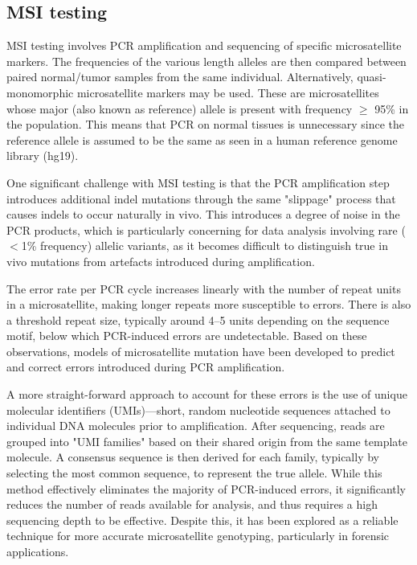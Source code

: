 \documentclass[fleqn,10pt]{olplainarticle}
\begin{document}

\subsection{MSI testing}

MSI testing involves PCR amplification and sequencing of specific microsatellite markers. The frequencies of the various length alleles are then compared between paired normal/tumor samples from the same individual. Alternatively, quasi-monomorphic microsatellite markers may be used. These are microsatellites whose major (also known as reference) allele is present with frequency $\geq$ 95\% in the population. This means that PCR on normal tissues is unnecessary since the reference allele is assumed to be the same as seen in a human reference genome library (hg19).

One significant challenge with MSI testing is that the PCR amplification step introduces additional indel mutations through the same "slippage" process that causes indels to occur naturally in vivo. This introduces a degree of noise in the PCR products, which is particularly concerning for data analysis involving rare ($<$1\% frequency) allelic variants, as it becomes difficult to distinguish true in vivo mutations from artefacts introduced during amplification.

The error rate per PCR cycle increases linearly with the number of repeat units in a microsatellite, making longer repeats more susceptible to errors. There is also a threshold repeat size, typically around 4–5 units depending on the sequence motif, below which PCR-induced errors are undetectable. Based on these observations, models of microsatellite mutation have been developed to predict and correct errors introduced during PCR amplification.

A more straight-forward approach to account for these errors is the use of unique molecular identifiers (UMIs)—short, random nucleotide sequences attached to individual DNA molecules prior to amplification. After sequencing, reads are grouped into "UMI families" based on their shared origin from the same template molecule. A consensus sequence is then derived for each family, typically by selecting the most common sequence, to represent the true allele. While this method effectively eliminates the majority of PCR-induced errors, it significantly reduces the number of reads available for analysis, and thus requires a high sequencing depth to be effective. Despite this, it has been explored as a reliable technique for more accurate microsatellite genotyping, particularly in forensic applications.
\end{document}
